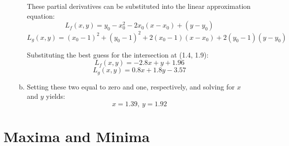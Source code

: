\documentclass{article}
\begin{document}
\begin{enumerate}[1.]
\begin{enumerate}[a.]
        These partial derivatives can be substituted into the linear approximation
        equation:
        $$ L_{f}(x,y) = y_{0} - x_{0}^{2} - 2x_{0}(x - x_{0}) + (y - y_{0}) $$
        $$ L_{g}(x,y) = (x_{0} - 1)^{2} + (y_{0} - 1)^{2} + 2(x_{0} - 1)(x -
        x_{0}) + 2(y_{0} - 1)(y - y_{0}) $$

        Substituting the best guess for the intersection at (1.4, 1.9):
        $$ L_{f}(x,y) = -2.8x + y + 1.96 $$
        $$ L_{g}(x,y) = 0.8x + 1.8y - 3.57 $$

      \item Setting these two equal to zero and one, respectively, and solving for
        $x$ and $y$ yields:
        $$ x = 1.39, \ y = 1.92 $$

    \end{enumerate}

\end{enumerate}

\section{Maxima and Minima}
\end{document}
